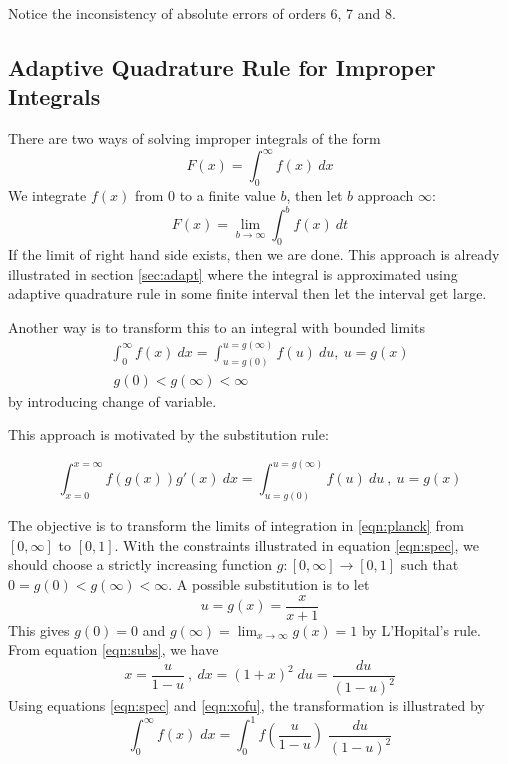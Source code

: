 \documentclass[a4paper, 11pt]{article}
\begin{document}
Notice the inconsistency of absolute errors of orders 6, 7 and 8.

\subsection{Adaptive Quadrature Rule for Improper Integrals}
There are two ways of solving improper integrals of the form
\begin{equation}
F(x) = \int_{0}^{\infty} f(x) \ dx
\end{equation}
We integrate $f(x)$ from 0 to a finite value $b$, then let $b$ approach $\infty$:
\begin{equation}
F(x) = \lim_{b \rightarrow \infty} \int_{0}^{b} f(x) \ dt
\end{equation}
If the limit of right hand side exists, then we are done. This approach is already illustrated in section \ref{sec:adapt} where the integral is approximated using adaptive quadrature rule in some finite interval then let the interval get large.


Another way is to transform this to an integral with bounded limits
\begin{align}\label{eqn:spec}
\int_{0}^{\infty} f(x) \ dx = \int_{u=g(0)}^{u=g(\infty)} f(u) \ du, \ u=g(x) \\ \ g(0) < g(\infty) < \infty
\end{align}
by introducing change of variable.

This approach is motivated by the substitution rule:

\begin{equation}
\int_{x=0}^{x=\infty} f(g(x))g'(x) \ dx = \int_{u=g(0)}^{u=g(\infty)} f(u) \ du \ , \ u=g(x)
\end{equation}

The objective is to transform the limits of integration in \ref{eqn:planck} from  $[0,\infty]$ to $[0, 1]$. With the constraints illustrated in equation \ref{eqn:spec}, we should choose a strictly increasing function $g: [0, \infty] \rightarrow [0, 1]$ such that $0=g(0)<g(\infty)<\infty.$ A possible substitution is to let
\begin{equation}\label{eqn:subs}
u = g(x) = \frac{x}{x+1}
\end{equation}
This gives $g(0)=0$ and $g(\infty)=\lim_{x \rightarrow \infty}g(x)=1$ by L'Hopital's rule. From equation \ref{eqn:subs}, we have
\begin{equation}\label{eqn:xofu}
x = \frac{u}{1-u} \ , \ dx=(1+x)^2\;du=\frac{du}{(1-u)^2}
\end{equation}
Using equations \ref{eqn:spec} and \ref{eqn:xofu}, the transformation is illustrated by
\begin{equation}\label{eqn:trans}
\int_0^{\infty}f(x)\;dx = \int_{0}^{1} f\left(\frac{u}{1-u}\right)\;\frac{du}{(1-u)^2}
\end{equation}
\end{document}
